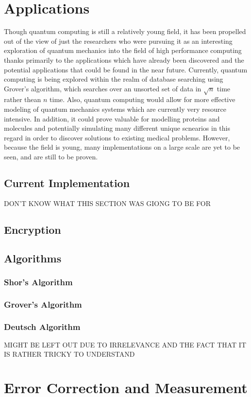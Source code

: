\documentclass[12pt]{article}
\begin{document}
\section{Applications}
Though quantum computing is still a relatively young field, it has been propelled out of the view of just the researchers who were pursuing it as an interesting exploration of quantum mechanics into the field of high performance computing thanks primarily to the applications which have already been discovered and the potential applications that could be found in the near future. Currently, quantum computing is being explored within the realm of database searching using Grover's algorithm, which searches over an unsorted set of data in $\sqrt{n}$ time rather thean $n$ time. Also, quantum computing would allow for more effective modeling of quantum mechanics systems which are currently very resource intensive. In addition, it could prove valuable for modelling proteins and molecules and potentially simulating many different unique scnearios in this regard in order to discover solutions to existing medical problems. However, because the field is young, many implementations on a large scale are yet to be seen, and are still to be proven.
\subsection{Current Implementation}
DON'T KNOW WHAT THIS SECTION WAS GIONG TO BE FOR
\subsection{Encryption}
\subsection{Algorithms}
\subsubsection{Shor's Algorithm}
\subsubsection{Grover's Algorithm}
\subsubsection{Deutsch Algorithm}
MIGHT BE LEFT OUT DUE TO IRRELEVANCE AND THE FACT THAT IT IS RATHER TRICKY TO UNDERSTAND
\section{Error Correction and Measurement}
\end{document}
